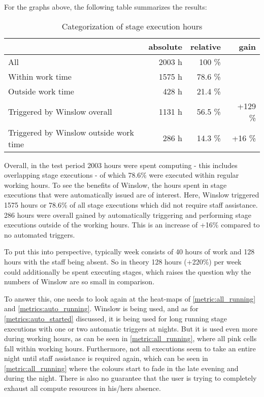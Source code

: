 For the graphs above, the following table summarizes the results:

\begin{table}[H]
	\centering
	\begin{tabular}{|l|r|r|r|}\hline
												& absolute 			& relative	& gain \\
		\hline
		All 		 							& 2003 h 			& 100 \% 	& \\
		Within work time						& 1575 h			& 78.6 \% 	& \\
		Outside work time	 					&  428 h			& 21.4 \% 	& \\
		Triggered by Winslow overall			& 1131 h			& 56.5 \%	& +129 \%\\
		Triggered by Winslow outside work time	&  286 h 			& 14.3 \% 	& +16 \%\\
\hline
	\end{tabular}
	\caption{Categorization of stage execution hours}
\end{table}

Overall, in the test period 2003 hours were spent computing - this includes overlapping stage executions - of which 78.6\% were executed within regular working hours.
To see the benefits of Winslow, the hours spent in stage executions that were automatically issued are of interest.
Here, Winslow triggered 1575 hours or 78.6\% of all stage executions which did not require staff assistance.
286 hours were overall gained by automatically triggering and performing stage executions outside of the working hours.
This is an increase of +16\% compared to no automated triggers.

To put this into perspective, typically week consists of 40 hours of work and 128 hours with the staff being absent.
So in theory 128 hours (+220\%) per week could additionally be spent executing stages, which raises the question why the numbers of Winslow are so small in comparison.

To answer this, one needs to look again at the heat-maps of \autoref{metric:all_running} and \autoref{metrics:auto_running}.
Winslow is being used, and as for \autoref{metrics:auto_started} discussed, it is being used for long running stage executions with one or two automatic triggers at nights.
But it is used even more during working hours, as can be seen in \autoref{metric:all_running}, where all pink cells fall within working hours.
Furthermore, not all executions seem to take an entire night until staff assistance is required again, which can be seen in \autoref{metric:all_running} where the colours start to fade in the late evening and during the night.
There is also no guarantee that the user is trying to completely exhaust all compute resources in his/hers absence.

